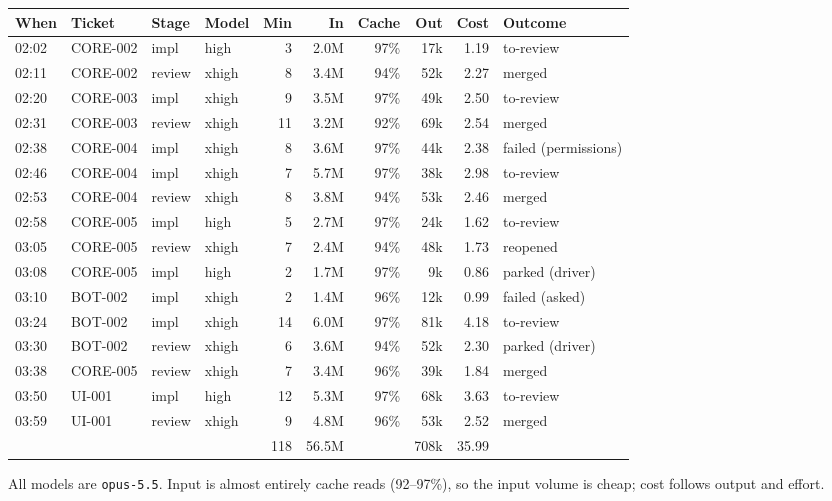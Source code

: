 \documentclass[11pt,a4paper]{article}
\begin{document}
{\small
\begin{tabularx}{\linewidth}{@{}llllrrrrrX@{}}
\toprule
When & Ticket & Stage & Model & Min & In & Cache & Out & Cost & Outcome \\
\midrule
02:02 & CORE-002 & impl & high & 3 & 2.0M & 97\% & 17k & 1.19 & to-review \\
02:11 & CORE-002 & review & xhigh & 8 & 3.4M & 94\% & 52k & 2.27 & merged \\
02:20 & CORE-003 & impl & xhigh & 9 & 3.5M & 97\% & 49k & 2.50 & to-review \\
02:31 & CORE-003 & review & xhigh & 11 & 3.2M & 92\% & 69k & 2.54 & merged \\
02:38 & CORE-004 & impl & xhigh & 8 & 3.6M & 97\% & 44k & 2.38 & failed (permissions) \\
02:46 & CORE-004 & impl & xhigh & 7 & 5.7M & 97\% & 38k & 2.98 & to-review \\
02:53 & CORE-004 & review & xhigh & 8 & 3.8M & 94\% & 53k & 2.46 & merged \\
02:58 & CORE-005 & impl & high & 5 & 2.7M & 97\% & 24k & 1.62 & to-review \\
03:05 & CORE-005 & review & xhigh & 7 & 2.4M & 94\% & 48k & 1.73 & reopened \\
03:08 & CORE-005 & impl & high & 2 & 1.7M & 97\% & 9k & 0.86 & parked (driver) \\
03:10 & BOT-002 & impl & xhigh & 2 & 1.4M & 96\% & 12k & 0.99 & failed (asked) \\
03:24 & BOT-002 & impl & xhigh & 14 & 6.0M & 97\% & 81k & 4.18 & to-review \\
03:30 & BOT-002 & review & xhigh & 6 & 3.6M & 94\% & 52k & 2.30 & parked (driver) \\
03:38 & CORE-005 & review & xhigh & 7 & 3.4M & 96\% & 39k & 1.84 & merged \\
03:50 & UI-001 & impl & high & 12 & 5.3M & 97\% & 68k & 3.63 & to-review \\
03:59 & UI-001 & review & xhigh & 9 & 4.8M & 96\% & 53k & 2.52 & merged \\
\midrule
 & & & & 118 & 56.5M & & 708k & 35.99 & \\
\bottomrule
\end{tabularx}
}

All models are \texttt{opus-5.5}. Input is almost entirely cache reads (92--97\%), so the
input volume is cheap; cost follows output and effort.
\end{document}
